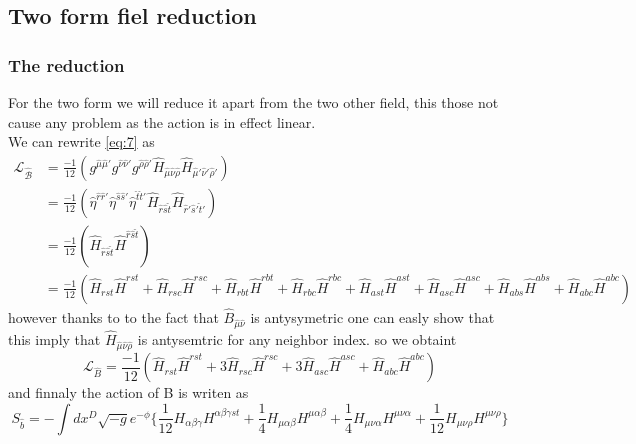 \documentclass{article}
\begin{document}
\subsection{Two form fiel reduction}
\subsubsection{The reduction}
For the two form we will reduce it apart from the two other field, this those not cause any problem as the action is in effect linear.\\
We can rewrite \eqref{eq:7} as
\begin{align*}
    \mathcal{L_{\hat B}} &= \frac{-1}{12}(g^{ \hat \mu  \hat \mu'} g^{\hat \nu \hat \nu'} g^{\hat \rho  \hat \rho'} \hat H_{ \hat \mu \hat \nu \hat \rho} \hat H_{ \hat \mu' \hat \nu' \hat \rho'})\\
    &=\frac{-1}{12} (\hat \eta^{ \hat r \hat r'} \hat \eta^{\hat s \hat s'} \hat \eta^{\hat t \hat t'} \hat H_{ \hat r \hat s \hat t} \hat H_{ \hat r'  \hat s' \hat t'})\\
    &=\frac{-1}{12}(\hat H_{ \hat r \hat s\hat t}\hat H^{ \hat r \hat s \hat t})\\
    &=\frac{-1}{12}(\hat H_{  r  s t}\hat H^{  r  s  t} + \hat H_{  r  s c}\hat H^{  r  s  c} + \hat H_{  r  b t}\hat H^{  r  b  t} + \hat H_{  r  b c}\hat H^{  r  b  c} + \hat H_{  a  s t}\hat H^{  a  s  t} + \hat H_{  a  s c}\hat H^{  a  s  c} + \hat H_{  a  b s}\hat H^{  a  b  s} + \hat H_{  a  b c}\hat H^{  a  b  c})
\end{align*}
however thanks to to the fact that $\hat B_{\hat \mu \hat \nu}$ is antysymetric one can easly show that this imply that $\hat H_{ \hat \mu \hat \nu \hat \rho}$ is antysemtric for any neighbor index. so we obtaint
\begin{equation}
    \mathcal{L}_{\hat B} =\frac{-1}{12} (\hat H_{  r  s t}\hat H^{  r  s  t} + 3\hat H_{  r  s c}\hat H^{  r  s  c} + 3\hat H_{  a  s c}\hat H^{  a  s  c} + \hat H_{  a  b c}\hat H^{  a  b  c})
\end{equation}
and finnaly the action of B is writen as
\begin{equation} \label{eq:31}
    \boxed{S_{\hat b } = - \int dx^D\sqrt{-g}e^{-\phi} \Big\lbrace  \frac{1}{12} H_{  \alpha  \beta \gamma} H^{  \alpha \beta \gamma  s  t} + \frac{1}{4} H_{  \mu   \alpha \beta} H^{  \mu   \alpha  \beta} + \frac{1}{4} H_{  \mu \nu \alpha } H^{  \mu  \nu  \alpha} + \frac{1}{12} H_{  \mu  \nu \rho}H^{  \mu  \nu  \rho} \Big\rbrace }
\end{equation}
\end{document}
